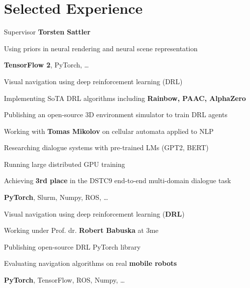 \documentclass[a4paper]{deedy-resume}
\begin{document}
\begin{minipage}[t]{0.66\textwidth}

\section{Selected Experience}
\vspace{\topsep}
\begin{tightitemize}
\item Supervisor \textbf{Torsten Sattler} 
\item Using priors in neural rendering and neural scene representation
\item \textbf{TensorFlow 2}, PyTorch, \ldots
\end{tightitemize}
\sectionspace


\begin{tightitemize}
\item Visual navigation using deep reinforcement learning (DRL)
\item Implementing SoTA DRL algorithms including \textbf{Rainbow, PAAC, AlphaZero} 
\item Publishing an open-source 3D environment simulator to train DRL agents
\item Working with \textbf{Tomas Mikolov} on cellular automata applied to NLP
\item Researching dialogue systems with pre-trained LMs (GPT2, BERT)
\item Running large distributed GPU training
\item Achieving \textbf{3rd place} in the DSTC9 end-to-end multi-domain dialogue task
\item \textbf{PyTorch}, Slurm, Numpy, ROS, \ldots
\end{tightitemize}
\sectionspace


\begin{tightitemize}
\item Visual navigation using deep reinforcement learning (\textbf{DRL})
\item Working under Prof. dr. \textbf{Robert Babuska} at 3me
\item Publishing open-source DRL PyTorch library
\item Evaluating navigation algorithms on real \textbf{mobile robots} 
\item \textbf{PyTorch}, TensorFlow, ROS, Numpy, \ldots
\end{tightitemize}
\sectionspace


\end{minipage}
\end{document}
